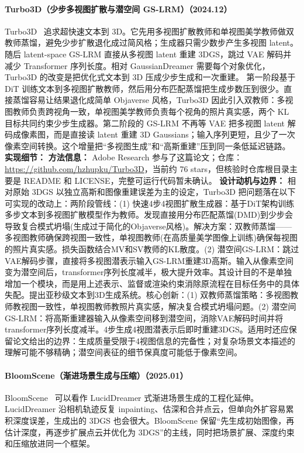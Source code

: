 \paragraph{Turbo3D（少步多视图扩散与潜空间 GS-LRM）（2024.12）}
Turbo3D~\cite{2412_04470} 追求超快速文本到 3D。它先用多视图扩散教师和单视图美学教师做双教师蒸馏，避免少步扩散退化成过简风格；生成器只需少数步产生多视图 latent。随后 latent-space GS-LRM 直接从多视图 latent 重建 3DGS，跳过 VAE 解码并减少 Transformer 序列长度。相对 GaussianDreamer 需要每个对象优化，Turbo3D 的改变是把优化式文本到 3D 压成少步生成和一次重建。
第一阶段基于 DiT 训练文本到多视图扩散教师，然后用分布匹配蒸馏把生成步数压到很少。直接蒸馏容易让结果退化成简单 Objaverse 风格，Turbo3D 因此引入双教师：多视图教师负责跨视角一致，单视图美学教师负责每个视角的照片真实感，两个 KL 目标共同约束少步生成器。第二阶段的 GS-LRM 不再等 VAE 把多视图 latent 解码成像素图，而是直接读 latent 重建 3D Gaussians；输入序列更短，且少了一次像素空间转换。这个增量把“多视图生成”和“高斯重建”压到同一条低延迟链路。
\textbf{实现细节：}
\textbf{方法信息：} Adobe Research 参与了这篇论文；仓库：\url{https://github.com/hzhupku/Turbo3D}，当前约 76 stars，但核验时仓库根目录主要是 README 和 LICENSE，完整可运行代码暂未确认。
\textbf{设计动机与边界：} 相对原始 3DGS 以独立高斯和图像重建误差为主的设定，Turbo3D 把问题落在以下可实现的改动上：两阶段管线：(1) 快速4步4视图扩散生成器：基于DiT架构训练多步文本到多视图扩散模型作为教师。发现直接用分布匹配蒸馏(DMD)到少步会导致复合模式坍塌(生成过于简化的Objaverse风格)。解决方案：双教师蒸馏——多视图教师确保跨视图一致性，单视图教师(在高质量美学图像上训练)确保每视图的照片真实感。损失函数结合MV和SV教师的KL散度。(2) 潜空间GS-LRM：跳过VAE解码步骤，直接将多视图潜表示输入GS-LRM重建3D高斯。输入从像素空间变为潜空间后，transformer序列长度减半，极大提升效率。其设计目的不是单独增加一个模块，而是用上述表示、监督或渲染约束消除原流程在目标任务中的具体失配。提出亚秒级文本到3D生成系统。核心创新：(1) 双教师蒸馏策略：多视图教师教视图一致性，单视图教师教照片真实感，解决复合模式坍塌问题。(2) 潜空间GS-LRM：将高斯重建器输入从像素空间移到潜空间，消除VAE解码时间并将transformer序列长度减半。4步生成4视图潜表示后即时重建3DGS。适用时还应保留论文给出的边界：生成质量受限于4视图信息的完备性；对复杂场景文本描述的理解可能不够精确；潜空间表征的细节保真度可能低于像素空间。
\paragraph{BloomScene（渐进场景生成与压缩）（2025.01）}
BloomScene~\cite{2501_10462} 可以看作 LucidDreamer 式渐进场景生成的工程化延伸。LucidDreamer 沿相机轨迹反复 inpainting、估深和合并点云，但单向外扩容易累积深度误差，生成出的 3DGS 也会很大。BloomScene 保留“先生成初始图像，再估计深度，再逐步扩展点云并优化为 3DGS”的主线，同时把场景扩展、深度约束和压缩放进同一个框架。

